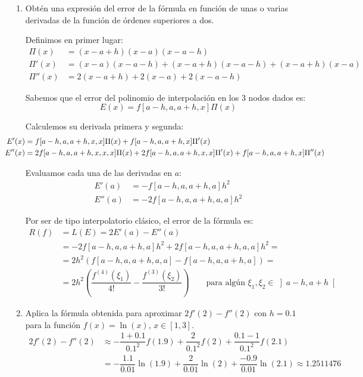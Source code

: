 \begin{ejercicio}
\begin{enumerate}
        \item Obtén una expresión del error de la fórmula en función de unas o varias derivadas de la función de órdenes superiores a dos.
        
        Definimos en primer lugar:
        \begin{align*}
            \Pi(x) &= (x-a+h)(x-a)(x-a-h)\\
            \Pi'(x) &= (x-a)(x-a-h) + (x-a+h)(x-a-h) + (x-a+h)(x-a)\\
            \Pi''(x) &= 2(x-a+h) + 2(x-a) + 2(x-a-h)
        \end{align*}
        
        Sabemos que el error del polinomio de interpolación en los $3$ nodos dados es:
        \begin{equation*}
            E(x) = f[a-h, a, a+h, x]\Pi(x)
        \end{equation*}

        Calculemos su derivada primera y segunda:
        \begin{align*}
            \hspace{-1cm}E'(x) &= f[a-h, a, a+h, x, x]\Pi(x) + f[a-h, a, a+h, x]\Pi'(x)\\
            \hspace{-1cm}E''(x) &= 2f[a-h, a, a+h, x, x, x]\Pi(x) + 2f[a-h, a, a+h, x, x]\Pi'(x)+f[a-h, a, a+h, x]\Pi''(x)
        \end{align*}

        Evaluamos cada una de las derivadas en $a$:
        \begin{align*}
            E'(a) &= -f[a-h, a, a+h, a]h^2\\
            E''(a) &= -2f[a-h, a, a+h, a, a]h^2
        \end{align*}

        Por ser de tipo interpolatorio clásico, el error de la fórmula es:
        \begin{align*}
            R(f) &= L(E) = 2E'(a) - E''(a) \\
            &= -2f[a-h, a, a+h, a]h^2+2f[a-h, a, a+h, a, a]h^2
            =\\&= 2h^2\left(f[a-h, a, a+h, a, a]-f[a-h, a, a+h, a]\right)
            =\\&= 2h^2\left(\dfrac{f^{(4)}(\xi_1)}{4!}-\dfrac{f^{(3)}(\xi_2)}{3!}\right)\qquad \text{para algún }\xi_1,\xi_2\in\left]a-h,a+h\right[
        \end{align*}
        
        \item Aplica la fórmula obtenida para aproximar $2f'(2) - f''(2)$ con $h = 0.1$ para la función $f(x) = \ln(x)$, $x \in [1, 3]$.
        \begin{align*}
            2f'(2) - f''(2) &\approx -\dfrac{1+0.1}{0.1^2}f(1.9) + \dfrac{2}{0.1^2}f(2) + \dfrac{0.1-1}{0.1^2}f(2.1)\\
            &= -\dfrac{1.1}{0.01}\ln(1.9) + \dfrac{2}{0.01}\ln(2) + \dfrac{-0.9}{0.01}\ln(2.1) \approx 1.2511476
        \end{align*}
        

\end{enumerate}
\end{ejercicio}
